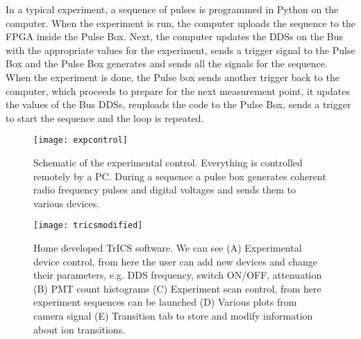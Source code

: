 In a typical experiment, a sequence of pulses is programmed in Python on the computer. When the experiment is run, the computer uploads the sequence to the FPGA inside the Pulse Box. Next, the computer updates the DDSs on the Bus with the appropriate values for the experiment, sends a trigger signal to the Pulse Box and the Pulse Box generates and sends all the signals for the sequence. When the experiment is done, the Pulse box sends another trigger back to the computer, which proceeds to prepare for the next measurement point, it updates the values of the Bus DDSs, reuploads the code to the Pulse Box, sends a trigger to start the sequence and the loop is repeated.

\begin{figure}
\centering
\texttt{[image: expcontrol]}
\caption{Schematic of the experimental control. Everything is controlled remotely by a PC. During a sequence a pulse box generates coherent radio frequency pulses and digital voltages and sends them to various devices.}
\label{expcontrol}
\end{figure}

\begin{figure}
\centering
\texttt{[image: tricsmodified]}
\caption{Home developed TrICS software. We can see (A) Experimental device control, from here the user can add new devices and change their parameters, e.g. DDS frequency, switch ON/OFF, attenuation (B) PMT count histograms (C) Experiment scan control, from here experiment sequences can be launched (D) Various plots from camera signal (E) Transition tab to store and modify information about ion transitions.}
\label{trics}
\end{figure}
